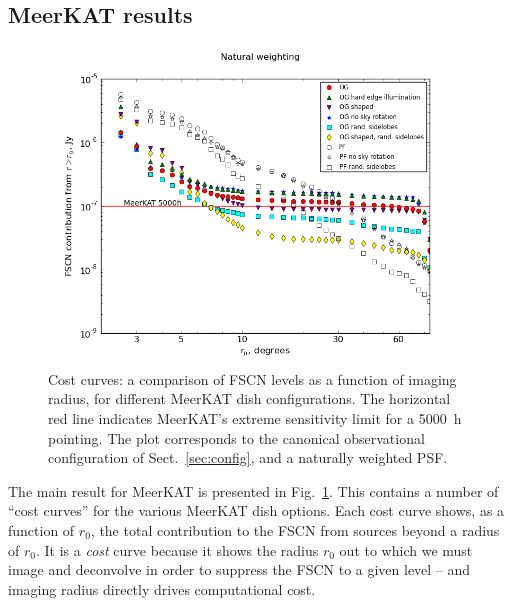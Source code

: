 \documentclass{aa}
\begin{document}
\subsection{MeerKAT results}
\label{sec:meerkat-costcurve}

\begin{figure}
  \includegraphics[width=\textwidth]{costcurve-main}\hfill
\caption{\label{fig:cc-main}Cost curves: a comparison of FSCN levels as a function of imaging radius, for different MeerKAT dish configurations. The horizontal red line indicates MeerKAT's extreme sensitivity limit for a 5000~h pointing. The plot corresponds to the canonical observational configuration of Sect.~\ref{sec:config}, and a naturally weighted PSF.}
\end{figure}

The main result for MeerKAT is presented in Fig.~\ref{fig:cc-main}. This contains a number of ``cost curves'' for the various MeerKAT dish options. Each cost curve shows, as a function of $r_0$, the total contribution to the FSCN from sources beyond a radius of $r_0$. It is a \emph{cost} curve because it shows the radius $r_0$ out to which we must image and deconvolve in order to suppress the FSCN to a given level -- and imaging radius directly drives computational cost. 
\end{document}
